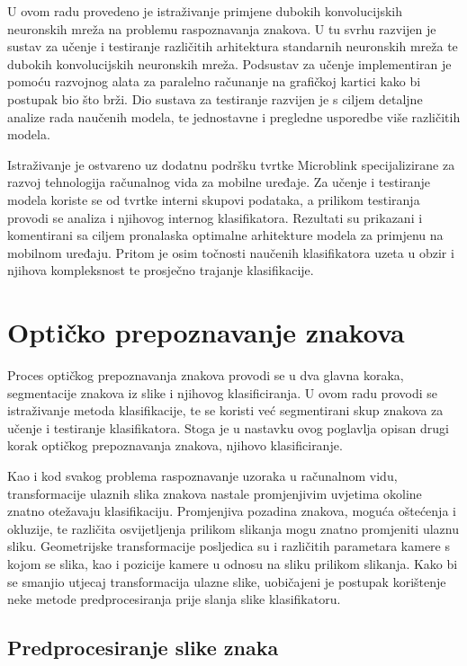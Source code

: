 \documentclass[lmodern, utf8, diplomski, numeric]{fer}
\begin{document}
U ovom radu provedeno je istraživanje primjene dubokih konvolucijskih neuronskih mreža na problemu raspoznavanja znakova. U tu svrhu razvijen je sustav za učenje i testiranje različitih arhitektura standarnih neuronskih mreža te dubokih konvolucijskih neuronskih mreža. Podsustav za učenje implementiran je pomoću razvojnog alata za paralelno računanje na grafičkoj kartici kako bi postupak bio što brži. Dio sustava za testiranje razvijen je s ciljem detaljne analize rada naučenih modela, te jednostavne i pregledne usporedbe više različitih modela. 

Istraživanje je ostvareno uz dodatnu podršku tvrtke Microblink specijalizirane za razvoj tehnologija računalnog vida za mobilne uređaje. Za učenje i testiranje modela koriste se od tvrtke interni skupovi podataka, a prilikom testiranja provodi se analiza i njihovog internog klasifikatora. 
Rezultati su prikazani i komentirani sa ciljem pronalaska optimalne arhitekture modela za primjenu na mobilnom uređaju. Pritom je osim točnosti naučenih klasifikatora uzeta u obzir i njihova kompleksnost te prosječno trajanje klasifikacije.





\chapter{Optičko prepoznavanje znakova}

Proces optičkog prepoznavanja znakova provodi se u dva glavna koraka, segmentacije znakova iz slike i njihovog klasificiranja. U ovom radu provodi se istraživanje metoda klasifikacije, te se koristi već segmentirani skup znakova za učenje i testiranje klasifikatora. Stoga je u nastavku ovog poglavlja opisan drugi korak optičkog prepoznavanja znakova, njihovo klasificiranje.

Kao i kod svakog problema raspoznavanje uzoraka u računalnom vidu, transformacije ulaznih slika znakova nastale promjenjivim uvjetima okoline znatno otežavaju klasifikaciju. Promjenjiva pozadina znakova, moguća oštećenja i okluzije, te različita osvijetljenja prilikom slikanja mogu znatno promjeniti ulaznu sliku. Geometrijske transformacije posljedica su i različitih parametara kamere s kojom se slika, kao i pozicije kamere u odnosu na sliku prilikom slikanja.  
Kako bi se smanjio utjecaj transformacija ulazne slike, uobičajeni je postupak korištenje neke metode predprocesiranja prije slanja slike klasifikatoru.

\section{Predprocesiranje slike znaka}
\end{document}

